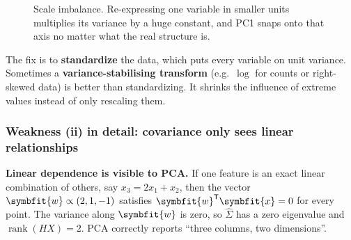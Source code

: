 \documentclass[11pt]{article}
\newcommand{\bm}[1]{\symbfit{#1}}
\newcommand{\vx}{\bm{x}}
\newcommand{\vw}{\bm{w}}
\newcommand{\Sig}{\widehat{\Sigma}}
\newcommand{\T}{^{\mathsf T}}
\newcommand{\rank}{\operatorname{rank}}
\begin{document}
\begin{figure}[htbp]
\centering
{}
\caption{Scale imbalance. Re-expressing one variable in smaller units multiplies its
variance by a huge constant, and PC1 snaps onto that axis no matter what the real
structure is.}
\end{figure}

\begin{intuition}
The fix is to \textbf{standardize} the data, which puts every variable on unit variance.
Sometimes a \textbf{variance-stabilising transform} (e.g.\ $\log$ for counts or
right-skewed data) is better than standardizing. It shrinks the influence of extreme
values instead of only rescaling them.
\end{intuition}

\subsubsection*{Weakness (ii) in detail: covariance only sees linear relationships}

\textbf{Linear dependence is visible to PCA.} If one feature is an exact linear
combination of others, say $x_3=2x_1+x_2$, then the vector $\vw\propto(2,1,-1)$
satisfies $\vw\T\vx=0$ for every point. The variance along $\vw$ is zero, so
$\Sig$ has a zero eigenvalue and $\rank(HX)=2$. PCA correctly reports ``three columns,
two dimensions''.
\end{document}
